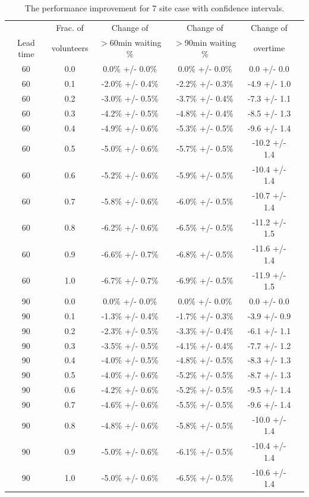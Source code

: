 \begin{table}[ht]
\centering
\begin{tabular}{cccccc}
  \hline
  & Frac. of & Change of & Change of & Change of \\
Lead time & volunteers & $>$60min waiting \% & $>$90min waiting \% & overtime \\ 
  \hline
  60 & 0.0 & 0.0\% +/- 0.0\% & 0.0\% +/- 0.0\% & 0.0 +/- 0.0 \\ 
  60 & 0.1 & -2.0\% +/- 0.4\% & -2.2\% +/- 0.3\% & -4.9 +/- 1.0 \\ 
  60 & 0.2 & -3.0\% +/- 0.5\% & -3.7\% +/- 0.4\% & -7.3 +/- 1.1 \\ 
  60 & 0.3 & -4.2\% +/- 0.5\% & -4.8\% +/- 0.4\% & -8.5 +/- 1.3 \\ 
  60 & 0.4 & -4.9\% +/- 0.6\% & -5.3\% +/- 0.5\% & -9.6 +/- 1.4 \\ 
  60 & 0.5 & -5.0\% +/- 0.6\% & -5.7\% +/- 0.5\% & -10.2 +/- 1.4 \\ 
  60 & 0.6 & -5.2\% +/- 0.6\% & -5.9\% +/- 0.5\% & -10.4 +/- 1.4 \\ 
  60 & 0.7 & -5.8\% +/- 0.6\% & -6.0\% +/- 0.5\% & -10.7 +/- 1.4 \\ 
  60 & 0.8 & -6.2\% +/- 0.6\% & -6.5\% +/- 0.5\% & -11.2 +/- 1.5 \\ 
  60 & 0.9 & -6.6\% +/- 0.7\% & -6.8\% +/- 0.5\% & -11.6 +/- 1.4 \\ 
  60 & 1.0 & -6.7\% +/- 0.7\% & -6.9\% +/- 0.5\% & -11.9 +/- 1.5 \\ 
  90 & 0.0 & 0.0\% +/- 0.0\% & 0.0\% +/- 0.0\% & 0.0 +/- 0.0 \\ 
  90 & 0.1 & -1.3\% +/- 0.4\% & -1.7\% +/- 0.3\% & -3.9 +/- 0.9 \\ 
  90 & 0.2 & -2.3\% +/- 0.5\% & -3.3\% +/- 0.4\% & -6.1 +/- 1.1 \\ 
  90 & 0.3 & -3.5\% +/- 0.5\% & -4.1\% +/- 0.4\% & -7.7 +/- 1.2 \\ 
  90 & 0.4 & -4.0\% +/- 0.5\% & -4.8\% +/- 0.5\% & -8.3 +/- 1.3 \\ 
  90 & 0.5 & -4.0\% +/- 0.6\% & -5.2\% +/- 0.5\% & -8.7 +/- 1.3 \\ 
  90 & 0.6 & -4.2\% +/- 0.6\% & -5.2\% +/- 0.5\% & -9.5 +/- 1.4 \\ 
  90 & 0.7 & -4.6\% +/- 0.6\% & -5.5\% +/- 0.5\% & -9.6 +/- 1.4 \\ 
  90 & 0.8 & -4.8\% +/- 0.6\% & -5.8\% +/- 0.5\% & -10.0 +/- 1.4 \\ 
  90 & 0.9 & -5.0\% +/- 0.6\% & -6.1\% +/- 0.5\% & -10.4 +/- 1.4 \\ 
  90 & 1.0 & -5.0\% +/- 0.6\% & -6.5\% +/- 0.5\% & -10.6 +/- 1.4 \\ 
   \hline
\end{tabular}
\caption{The performance improvement for 7 site case with confidence intervals.}
\label{table:7site}
\end{table}
